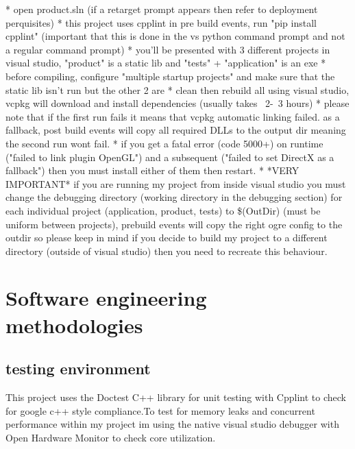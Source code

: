 \documentclass[]{final_report}
\begin{document}
* open product.sln (if a retarget prompt appears then refer to deployment perquisites) \newline
* this project uses cpplint in pre build events, run "pip install cpplint" (important that this is done in the vs python command prompt and not a regular command prompt) \newline
* you'll be presented with 3 different projects in visual studio, "product" is a static lib and "tests" + "application" is an exe \newline
* before compiling, configure "multiple startup projects" and make sure that the static lib isn't run but the other 2 are \newline
* clean then rebuild all using visual studio, vcpkg will download and install dependencies (usually takes ~2-~3 hours) \newline
* please note that if the first run fails it means that vcpkg automatic linking failed. as a fallback, post build events will copy all required DLLs to the output dir meaning the second run wont fail. \newline
* if you get a fatal error (code 5000+) on runtime ("failed to link plugin OpenGL") and a subsequent ("failed to set DirectX as a fallback") then you must install either of them then restart. \newline
* *VERY IMPORTANT* if you are running my project from inside visual studio you must change the debugging directory (working directory in the debugging section) for each individual project (application, product, tests)  to \$(OutDir) (must be uniform between projects), prebuild events will copy the right ogre config to the outdir so please keep in mind if you decide to build my project to a different directory (outside of visual studio) then you need to recreate this behaviour.\newline



\chapter{Software engineering methodologies}
\section{testing environment}
This project uses the Doctest C++ library for unit testing with Cpplint to check for google c++ style compliance.To test for memory leaks and concurrent performance within my project im using the native visual studio debugger with Open Hardware Monitor to check core utilization.
\end{document}

